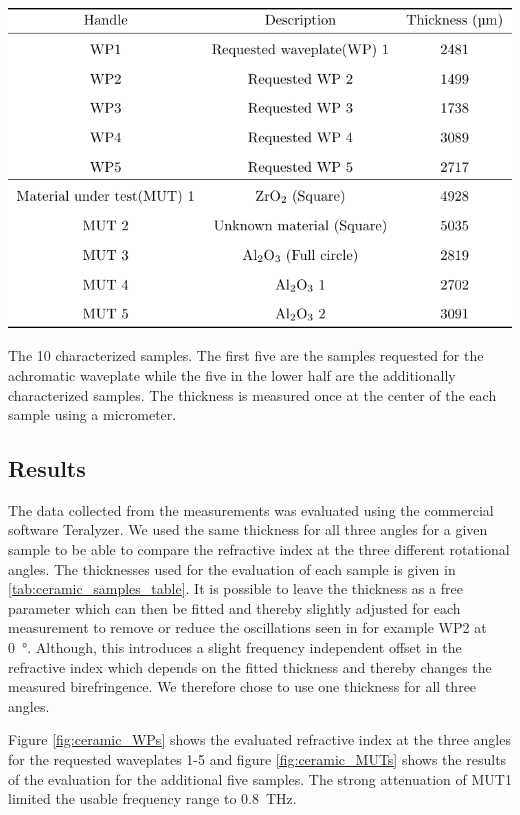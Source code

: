 \begin{table}[h]
    \centering
    \includegraphics[scale=1.0]{images/appendix/ceramic_samples_table.pdf}
    \caption{The 10 characterized samples. The first five are the samples requested for the achromatic waveplate while the five in the lower half are the additionally characterized samples. The thickness is measured once at the center of the each sample using a micrometer.}
    \label{tab:ceramic_samples_table}
\end{table}

\newpage

\subsection{Results}
The data collected from the measurements was evaluated using the commercial software Teralyzer. We used the same thickness for all three angles for a given sample to be able to compare the refractive index at the three different rotational angles. The thicknesses used for the evaluation of each sample is given in \ref{tab:ceramic_samples_table}. 
It is possible to leave the thickness as a free parameter which can then be fitted and thereby slightly adjusted for each measurement to remove or reduce the oscillations seen in for example WP2 at \SI{0}{\degree}. Although, this introduces a slight frequency independent offset in the refractive index which depends on the fitted thickness and thereby changes the measured birefringence. We therefore chose to use one thickness for all three angles. 

Figure \ref{fig:ceramic_WPs} shows the evaluated refractive index at the three angles for the requested waveplates 1-5 and figure \ref{fig:ceramic_MUTs} shows the results of the evaluation for the additional five samples. The strong attenuation of MUT1 limited the usable frequency range to \SI{0.8}{\tera \hertz}. 

